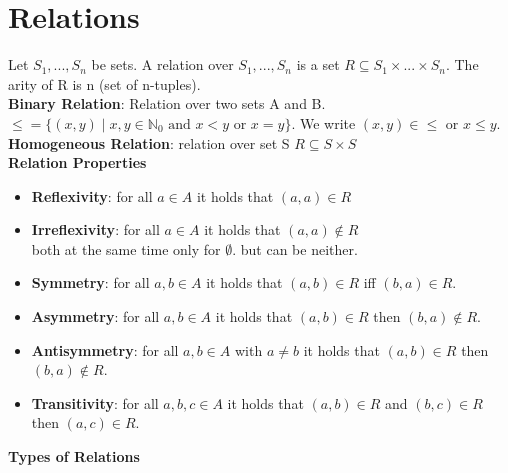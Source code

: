 \section*{Relations}
Let $S_1, ..., S_n$ be sets. A relation over $S_1, ..., S_n$ is a set $R \subseteq S_1 \times ... \times S_n$. The arity of R is n (set of n-tuples). \\
\textbf{Binary Relation}: Relation over two sets A and B. \\
$\leq = \{(x, y) \mid x,y \in \mathbb{N}_0 \text{ and } x < y \text{ or } x = y\}$. We write $(x, y) \in \leq$ or $x \leq y$. \\
\textbf{Homogeneous Relation}: relation over set S $R \subseteq S \times S$ \\
\textbf{Relation Properties}
\begin{itemize}[noitemsep,topsep=0pt,leftmargin=*]
    \item \textbf{Reflexivity}: for all $a \in A$ it holds that $(a,a) \in R$
    \item \textbf{Irreflexivity}: for all $a \in A$ it holds that $(a,a) \notin R$ \\ 
    both at the same time only for $\emptyset$. but can be neither. 
    \item \textbf{Symmetry}: for all $a, b \in A$ it holds that $(a,b) \in R$ iff $(b,a) \in R$.
    \item \textbf{Asymmetry}: for all $a, b \in A$ it holds that $(a,b) \in R$ then $(b,a) \notin R$.
    \item \textbf{Antisymmetry}: for all $a, b \in A$ with $a \neq b$ it holds that $(a,b) \in R$ then $(b,a) \notin R$.
    \item \textbf{Transitivity}: for all $a, b, c \in A$ it holds that $(a,b) \in R$ and $(b,c) \in R$ then $(a,c) \in R$.
\end{itemize}
\textbf{Types of Relations}
